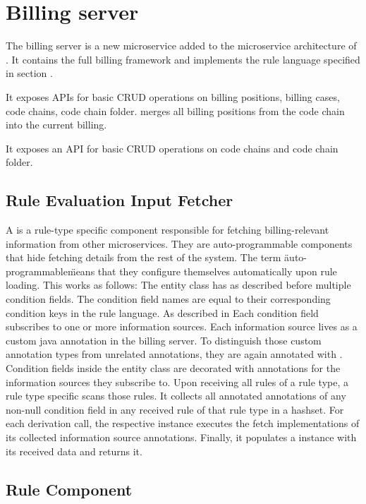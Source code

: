 \section{Billing server}\label{sec:billing-server}
The billing server is a new microservice added to the microservice architecture of \AV.
It contains the full billing framework and implements the rule language specified in section \addref.

It exposes APIs for basic CRUD operations on billing positions, billing cases, code chains, code chain folder.
 merges all billing positions from the code chain into the current billing.












It exposes an API for basic CRUD operations on code chains and code chain folder.


\subsection{Rule Evaluation Input Fetcher}\label{subsec:rule-evaluation-input-fetcher}
A  is a rule-type specific component responsible for fetching billing-relevant information from other \AV microservices.
They are auto-programmable components that hide fetching details from the rest of the system.
The term \"auto-programmable\" means that they configure themselves automatically upon rule loading.
This works as follows: The  entity class has as described before multiple condition fields.
The condition field names are equal to their corresponding condition keys in the rule language.
As described in \addref Each condition field subscribes to one or more information sources.
Each information source lives as a custom java annotation in the billing server.
To distinguish those custom annotation types from unrelated annotations, they are again annotated with .
Condition fields inside the  entity class are decorated with annotations for the information sources they subscribe to.
Upon receiving all rules of a rule type, a rule type specific  scans those rules.
It collects all  annotated annotations of any non-null condition field in any received rule of that rule type in a hashset.
For each derivation call, the respective  instance executes the fetch implementations of its collected information source annotations.
Finally, it populates a  instance with its received data and returns it.

\subsection{Rule Component}\label{subsec:rule-component}


